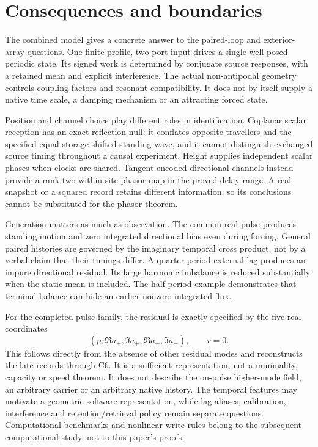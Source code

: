 \section{Consequences and boundaries}\label{sec:conclusion}
The combined model gives a concrete answer to the paired-loop and exterior-array questions. One finite-profile, two-port input drives a single well-posed periodic state. Its signed work is determined by conjugate source responses, with a retained mean and explicit interference. The actual non-antipodal geometry controls coupling factors and resonant compatibility. It does not by itself supply a native time scale, a damping mechanism or an attracting forced state.

Position and channel choice play different roles in identification. Coplanar scalar reception has an exact reflection null: it conflates opposite travellers and the specified equal-storage shifted standing wave, and it cannot distinguish exchanged source timing throughout a causal experiment. Height supplies independent scalar phases when clocks are shared. Tangent-encoded directional channels instead provide a rank-two within-site phasor map in the proved delay range. A real snapshot or a squared record retains different information, so its conclusions cannot be substituted for the phasor theorem.

Generation matters as much as observation. The common real pulse produces standing motion and zero integrated directional bias even during forcing. General paired histories are governed by the imaginary temporal cross product, not by a verbal claim that their timings differ. A quarter-period external lag produces an impure directional residual. Its large harmonic imbalance is reduced substantially when the static mean is included. The half-period example demonstrates that terminal balance can hide an earlier nonzero integrated flux.

For the completed pulse family, the residual is exactly specified by the five real coordinates
\begin{equation}\label{eq:compact}
 (\bar p,\Re a_+,\Im a_+,\Re a_-,\Im a_-),\qquad \bar r=0.
\end{equation}
This follows directly from the absence of other residual modes and reconstructs the late records through C6. It is a sufficient representation, not a minimality, capacity or speed theorem. It does not describe the on-pulse higher-mode field, an arbitrary carrier or an arbitrary native history. The temporal features may motivate a geometric software representation, while lag aliases, calibration, interference and retention/retrieval policy remain separate questions. Computational benchmarks and nonlinear write rules belong to the subsequent computational study, not to this paper's proofs.

